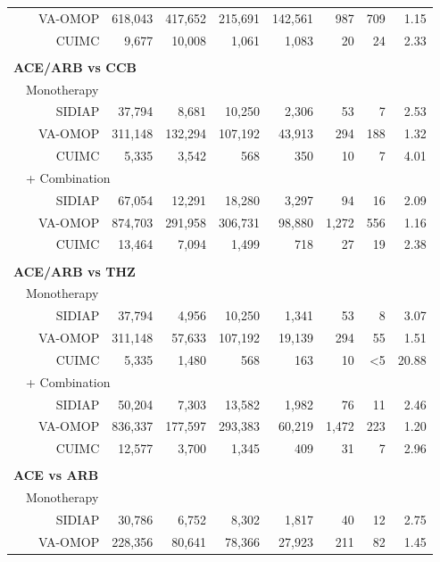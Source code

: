 \documentclass[11pt,]{article}
\begin{document}
\begin{longtable}{p{-2em}p{-2em}rrrrrrrr}
   &  & VA-OMOP & 618,043 & 417,652 & 215,691 & 142,561 & 987 & 709 & 1.15 \\ 
   &  & CUIMC & 9,677 & 10,008 & 1,061 & 1,083 & 20 & 24 & 2.33 \\ 
   \rowcolor{white} \\ \multicolumn{9}{l}{\textbf{ACE/ARB vs CCB}} \\ & \multicolumn{9}{l}{Monotherapy}  \\ &  & SIDIAP & 37,794 & 8,681 & 10,250 & 2,306 & 53 & 7 & 2.53 \\ 
   &  & VA-OMOP & 311,148 & 132,294 & 107,192 & 43,913 & 294 & 188 & 1.32 \\ 
   &  & CUIMC & 5,335 & 3,542 & 568 & 350 & 10 & 7 & 4.01 \\ 
                           & \multicolumn{8}{l}{+ Combination} \\ &  & SIDIAP & 67,054 & 12,291 & 18,280 & 3,297 & 94 & 16 & 2.09 \\ 
   &  & VA-OMOP & 874,703 & 291,958 & 306,731 & 98,880 & 1,272 & 556 & 1.16 \\ 
   &  & CUIMC & 13,464 & 7,094 & 1,499 & 718 & 27 & 19 & 2.38 \\ 
   \rowcolor{white} \\ \multicolumn{9}{l}{\textbf{ACE/ARB vs THZ}} \\ & \multicolumn{9}{l}{Monotherapy}  \\ &  & SIDIAP & 37,794 & 4,956 & 10,250 & 1,341 & 53 & 8 & 3.07 \\ 
   &  & VA-OMOP & 311,148 & 57,633 & 107,192 & 19,139 & 294 & 55 & 1.51 \\ 
   &  & CUIMC & 5,335 & 1,480 & 568 & 163 & 10 & <5 & 20.88 \\ 
                           & \multicolumn{8}{l}{+ Combination} \\ &  & SIDIAP & 50,204 & 7,303 & 13,582 & 1,982 & 76 & 11 & 2.46 \\ 
   &  & VA-OMOP & 836,337 & 177,597 & 293,383 & 60,219 & 1,472 & 223 & 1.20 \\ 
   &  & CUIMC & 12,577 & 3,700 & 1,345 & 409 & 31 & 7 & 2.96 \\ 
   \rowcolor{white} \\ \multicolumn{9}{l}{\textbf{ACE vs ARB}} \\ & \multicolumn{9}{l}{Monotherapy}  \\ &  & SIDIAP & 30,786 & 6,752 & 8,302 & 1,817 & 40 & 12 & 2.75 \\ 
   &  & VA-OMOP & 228,356 & 80,641 & 78,366 & 27,923 & 211 & 82 & 1.45 \\ 

\end{longtable}
\end{document}
